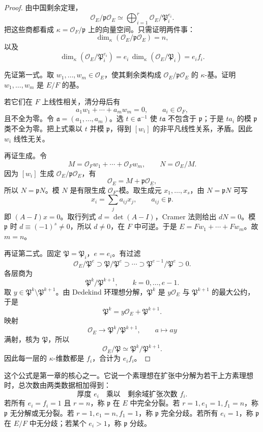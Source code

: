 \documentclass[11pt,a4paper,openany]{ctexbook}
\numberwithin{equation}{chapter}
\theoremstyle{plain}
\theoremstyle{definition}
\theoremstyle{remark}
\begin{document}
\begin{proof}
由中国剩余定理，
\[
\mathcal O_E/\mathfrak p\mathcal O_E
\simeq
\bigoplus_{i=1}^r \mathcal O_E/\mathfrak P_i^{e_i}.
\]
把这些商都看成 $\kappa=\mathcal O_F/\mathfrak p$ 上的向量空间。只需证明两件事：
\[
\dim_\kappa(\mathcal O_E/\mathfrak p\mathcal O_E)=n,
\]
以及
\[
\dim_\kappa(\mathcal O_E/\mathfrak P_i^{e_i})=e_i\,\dim_\kappa(\mathcal O_E/\mathfrak P_i)=e_if_i.
\]

先证第一式。取 $w_1,\dots,w_m\in\mathcal O_E$，使其剩余类构成 $\mathcal O_E/\mathfrak p\mathcal O_E$ 的 $\kappa$-基。证明 $w_1,\dots,w_m$ 是 $E/F$ 的基。

若它们在 $F$ 上线性相关，清分母后有
\[
a_1w_1+\cdots+a_mw_m=0,\qquad a_i\in\mathcal O_F,
\]
且不全为零。令 $\mathfrak a=(a_1,\dots,a_m)$。选 $t\in\mathfrak a^{-1}$ 使 $t\mathfrak a$ 不包含于 $\mathfrak p$；于是 $ta_i$ 的模 $\mathfrak p$ 类不全为零。把上式乘以 $t$ 并模 $\mathfrak p$，得到 $[w_i]$ 的非平凡线性关系，矛盾。因此 $w_i$ 线性无关。

再证生成。令
\[
M=\mathcal O_Fw_1+\cdots+\mathcal O_Fw_m,\qquad N=\mathcal O_E/M.
\]
因为 $[w_i]$ 生成 $\mathcal O_E/\mathfrak p\mathcal O_E$，有
\[
\mathcal O_E=M+\mathfrak p\mathcal O_E,
\]
所以 $N=\mathfrak pN$。模 $N$ 是有限生成 $\mathcal O_F$-模。取生成元 $x_1,\dots,x_s$，由 $N=\mathfrak pN$ 可写
\[
x_i=\sum_j a_{ij}x_j,\qquad a_{ij}\in\mathfrak p.
\]
即 $(A-I)x=0$。取行列式 $d=\det(A-I)$，Cramer 法则给出 $dN=0$。模 $\mathfrak p$ 时 $d\equiv(-1)^s\ne0$，所以 $d\ne0$，在 $F$ 中可逆。于是 $E=Fw_1+\cdots+Fw_m$。故 $m=n$。

再证第二式。固定 $\mathfrak P=\mathfrak P_i$，$e=e_i$。有过滤
\[
\mathcal O_E/\mathfrak P^e\supset
\mathfrak P/\mathfrak P^e\supset\cdots\supset
\mathfrak P^{e-1}/\mathfrak P^e\supset0.
\]
各层商为
\[
\mathfrak P^k/\mathfrak P^{k+1},\qquad k=0,\dots,e-1.
\]
取 $y\in\mathfrak P^k\setminus\mathfrak P^{k+1}$。由 Dedekind 环理想分解，$\mathfrak P^k$ 是 $y\mathcal O_E$ 与 $\mathfrak P^{k+1}$ 的最大公约，于是
\[
\mathfrak P^k=y\mathcal O_E+\mathfrak P^{k+1}.
\]
映射
\[
\mathcal O_E\longrightarrow \mathfrak P^k/\mathfrak P^{k+1},\qquad a\longmapsto ay
\]
满射，核为 $\mathfrak P$，所以
\[
\mathcal O_E/\mathfrak P\simeq \mathfrak P^k/\mathfrak P^{k+1}.
\]
因此每一层的 $\kappa$-维数都是 $f_i$，合计为 $e_if_i$。
\end{proof}

这个公式是第一章的核心之一。它说一个素理想在扩张中分解为若干上方素理想时，总次数由两类数据相加得到：
\[
\text{厚度 }e_i\quad\text{乘以}\quad\text{剩余域扩张次数 }f_i.
\]
若所有 $e_i=f_i=1$ 且 $r=n$，称 $\mathfrak p$ 在 $E$ 中完全分裂。若 $r=1,e_1=1,f_1=n$，称 $\mathfrak p$ 无分解或无分裂。若 $r=1,e_1=n,f_1=1$，称 $\mathfrak p$ 完全分歧。若所有 $e_i=1$，称 $\mathfrak p$ 在 $E/F$ 中无分歧；若某个 $e_i>1$，称 $\mathfrak p$ 分歧。
\end{document}
